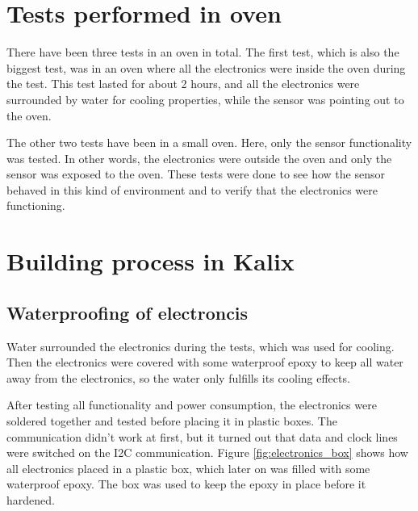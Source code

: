 \section{Tests performed in oven}

There have been three tests in an oven in total. The first test, which is also the biggest test, was in an oven where all the electronics were inside the oven during the test. This test lasted for about 2 hours, and all the electronics were surrounded by water for cooling properties, while the sensor was pointing out to the oven. 

The other two tests have been in a small oven. Here, only the sensor functionality was tested. In other words, the electronics were outside the oven and only the sensor was exposed to the oven. These tests were done to see how the sensor behaved in this kind of environment and to verify that the electronics were functioning.




\section{Building process in Kalix}

\subsection{Waterproofing of electroncis}


Water surrounded the electronics during the tests, which was used for cooling. Then the electronics were covered with some waterproof epoxy to keep all water away from the electronics, so the water only fulfills its cooling effects.

After testing all functionality and power consumption, the electronics were soldered together and tested before placing it in plastic boxes. The communication didn't work at first, but it turned out that data and clock lines were switched on the I2C communication. Figure \ref{fig:electronics_box} shows how all electronics placed in a plastic box, which later on was filled with some waterproof epoxy. The box was used to keep the epoxy in place before it hardened.



